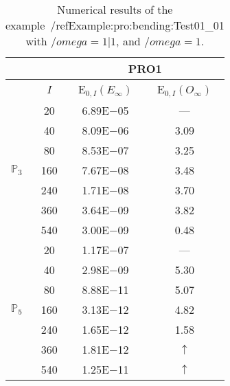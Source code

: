 \begin{table}[H]
\caption{Numerical results of the example~/ref{Example:pro:bending:Test01_01} with $/omega=1|1$, and $/omega=1$.}
\setlength{\tabcolsep}{5pt}
\centering
\begin{tabular}{@{}l c c c@{}}
\toprule
 &  & \multicolumn{2}{c}{PRO1}\\
\midrule
 & $I$ & E$_{0,I}(E_{\infty})$ & E$_{0,I}(O_{\infty})$\\
\midrule
\multirow{7}{*}{$\mathbb{P}_{3}$}
 & 20 & 6.89E$-$05 & ---\\
 & 40 & 8.09E$-$06 & 3.09\\
 & 80 & 8.53E$-$07 & 3.25\\
 & 160 & 7.67E$-$08 & 3.48\\
 & 240 & 1.71E$-$08 & 3.70\\
 & 360 & 3.64E$-$09 & 3.82\\
 & 540 & 3.00E$-$09 & 0.48\\
\midrule
\multirow{7}{*}{$\mathbb{P}_{5}$}
 & 20 & 1.17E$-$07 & ---\\
 & 40 & 2.98E$-$09 & 5.30\\
 & 80 & 8.88E$-$11 & 5.07\\
 & 160 & 3.13E$-$12 & 4.82\\
 & 240 & 1.65E$-$12 & 1.58\\
 & 360 & 1.81E$-$12 & $\uparrow$\\
 & 540 & 1.25E$-$11 & $\uparrow$\\
\bottomrule
\end{tabular}
\label{Table:pRO:test_01_01_test5_pro3}
\end{table}
